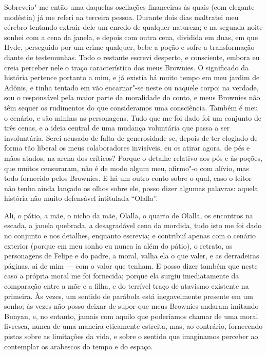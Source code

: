 Sobreveio"-me então uma daquelas oscilações financeiras às quais (com
elegante modéstia) já me referi na terceira pessoa.  Durante dois dias
maltratei meu cérebro tentando extrair dele um enredo de qualquer
natureza; e na segunda noite sonhei com a cena da janela, e depois com
outra cena, dividida em duas, em que Hyde, perseguido por um crime
qualquer, bebe a poção e sofre a transformação diante de testemunhas. 
Todo o restante escrevi desperto, e consciente, embora eu creia 
perceber nele o traço característico dos meus Brownies.  O
significado da história pertence portanto a mim, e já existia há muito
tempo em meu jardim de Adônis, e tinha tentado em vão encarnar"-se neste
ou naquele corpo; na verdade, sou o responsável pela maior parte da
moralidade do conto, e meus Brownies não têm sequer os rudimentos do que
consideramos uma consciência.  Também é meu o cenário, e são minhas as
personagens.  Tudo que me foi dado foi um conjunto de três cenas, e a
ideia central de uma mudança voluntária que passa a ser involuntária. 
Serei acusado de falta de generosidade se, depois de ter elogiado de
forma tão liberal os meus colaboradores invisíveis, eu os atirar agora,
de pés e mãos atados, na arena dos críticos?  Porque o detalhe
relativo aos pós e às poções, que muitos censuraram, não é de modo
algum meu, afirmo"-o com alívio, mas todo fornecido pelos Brownies.  E
há um outro conto sobre o qual, caso o leitor não tenha ainda lançado
os olhos sobre ele, posso dizer algumas palavras: aquela história não
muito defensável intitulada “Olalla”.

Ali, o pátio, a mãe, o nicho da mãe, Olalla, o quarto de Olalla, os
encontros na escada, a janela quebrada, a desagradável cena da mordida,
tudo isto me foi dado no conjunto e nos detalhes, enquanto escrevia; e
contribuí apenas com o cenário exterior (porque em meu sonho eu nunca
ia além do pátio), o retrato, as personagens de Felipe e do padre, a
moral, valha ela o que valer, e as derradeiras páginas, ai de mim --- com
o valor que tenham.  E posso dizer também que neste caso a própria
moral me foi fornecida; porque ela surgiu imediatamente da comparação
entre a mãe e a filha, e do terrível traço de atavismo existente na
primeira.  Às vezes, um sentido de parábola está inegavelmente presente
em um sonho; às vezes não posso deixar de supor que meus Brownies
andaram imitando Bunyan, e, no entanto, jamais com aquilo que
poderíamos chamar de uma moral livresca, nunca de uma maneira
eticamente estreita, mas, ao contrário, fornecendo pistas sobre as
limitações da vida, e sobre o sentido que imaginamos perceber ao
contemplar os arabescos do tempo e do espaço.

